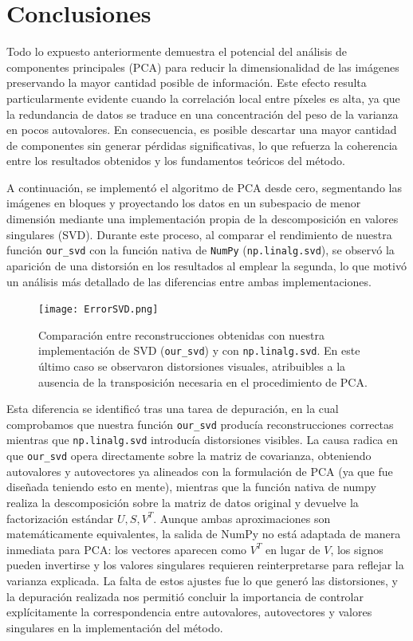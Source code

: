 \documentclass[12pt]{article}
\begin{document}
\section{Conclusiones}

Todo lo expuesto anteriormente demuestra el potencial del análisis de componentes principales (PCA) para reducir la dimensionalidad de las imágenes preservando la mayor cantidad posible de información. Este efecto resulta particularmente evidente cuando la correlación local entre píxeles es alta, ya que la redundancia de datos se traduce en una concentración del peso de la varianza en pocos autovalores. En consecuencia, es posible descartar una mayor cantidad de componentes sin generar pérdidas significativas, lo que refuerza la coherencia entre los resultados obtenidos y los fundamentos teóricos del método.

A continuación, se implementó el algoritmo de PCA desde cero, segmentando las imágenes en bloques y proyectando los datos en un subespacio de menor dimensión mediante una implementación propia de la descomposición en valores singulares (SVD). Durante este proceso, al comparar el rendimiento de nuestra función \texttt{our\_svd} con la función nativa de \texttt{NumPy} (\texttt{np.linalg.svd}), se observó la aparición de una distorsión en los resultados al emplear la segunda, lo que motivó un análisis más detallado de las diferencias entre ambas implementaciones.

\begin{figure}[H]
    \centering
    \texttt{[image: ErrorSVD.png]}
    \caption{Comparación entre reconstrucciones obtenidas con nuestra implementación de SVD (\texttt{our\_svd}) y con \texttt{np.linalg.svd}. En este último caso se observaron distorsiones visuales, atribuibles a la ausencia de la transposición necesaria en el procedimiento de PCA.}
    \label{fig:svd}
\end{figure}

Esta diferencia se identificó tras una tarea de depuración, en la cual comprobamos que nuestra función \texttt{our\_svd} producía reconstrucciones correctas mientras que \texttt{np.linalg.svd} introducía distorsiones visibles. La causa radica en que \texttt{our\_svd} opera directamente sobre la matriz de covarianza, obteniendo autovalores y autovectores ya alineados con la formulación de PCA (ya que fue diseñada teniendo esto en mente), mientras que la función nativa de numpy realiza la descomposición sobre la matriz de datos original y devuelve la factorización estándar $U,S,V^T$. Aunque ambas aproximaciones son matemáticamente equivalentes, la salida de NumPy no está adaptada de manera inmediata para PCA: los vectores aparecen como $V^T$ en lugar de $V$, los signos pueden invertirse y los valores singulares requieren reinterpretarse para reflejar la varianza explicada. La falta de estos ajustes fue lo que generó las distorsiones, y la depuración realizada nos permitió concluir la importancia de controlar explícitamente la correspondencia entre autovalores, autovectores y valores singulares en la implementación del método.
\end{document}
